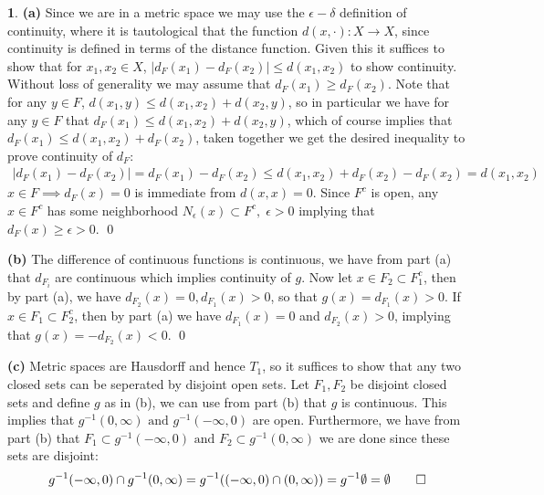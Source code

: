 \documentclass[10.5pt]{article}
\theoremstyle{definition}
\newtheorem{pb}{}
\newcommand{\abs}[1]{\left\vert#1\right\vert}
\newcommand{\tand}{\text{ and }}
\begin{document}
    \begin{pb}
        \textbf{(a)} Since we are in a metric space we may use the \(\epsilon-\delta\) definition of continuity, where it is tautological that the function \(d(x,\cdot):X \to X\), since continuity is defined in terms of the distance function. Given this it suffices to show that for \(x_1,x_2 \in X\), \(\abs{d_F(x_1) - d_F(x_2)} \leq d(x_1,x_2)\) to show continuity. Without loss of generality we may assume that \(d_F(x_1) \geq d_F(x_2)\). Note that for any \(y \in F\), \(d(x_1,y) \leq d(x_1,x_2) + d(x_2,y)\), so in particular we have for any \(y \in F\) that \(d_F(x_1) \leq d(x_1,x_2) + d(x_2,y)\), which of course implies that \(d_F(x_1) \leq d(x_1,x_2) + d_F(x_2)\), taken together we get the desired inequality to prove continuity of \(d_F\):
        \begin{align*}
            \abs{d_F(x_1) - d_F(x_2)} = d_F(x_1) - d_F(x_2) \leq d(x_1,x_2) + d_F(x_2) - d_F(x_2) = d(x_1,x_2)
        \end{align*}
        \(x \in F \implies d_F(x) = 0\) is immediate from \(d(x,x) = 0\). Since \(F^c\) is open, any \(x \in F^c\) has some neighborhood \(N_\epsilon(x) \subset F^c, \; \epsilon > 0\) implying that \(d_F(x) \geq \epsilon > 0\). \qed
        
        \textbf{(b)} The difference of continuous functions is continuous, we have from part (a) that \(d_{F_i}\) are continuous which implies continuity of \(g\). Now let \(x \in F_2 \subset F_1^c\), then by part (a), we have \(d_{F_2}(x) = 0, d_{F_1}(x) > 0\), so that \(g(x) = d_{F_1}(x) > 0\). If \(x \in F_1 \subset F_2^c\), then by part (a) we have \(d_{F_1}(x) = 0\) and \(d_{F_2}(x) > 0\), implying that \(g(x) = -d_{F_2}(x) < 0\). \qed

        \textbf{(c)} Metric spaces are Hausdorff and hence \(T_1\), so it suffices to show that any two closed sets can be seperated by disjoint open sets. Let \(F_1, F_2\) be disjoint closed sets and define \(g\) as in (b), we can use from part (b) that \(g\) is continuous. This implies that
        \(g^{-1}(0,\infty) \tand g^{-1}(-\infty,0)\) are open.  Furthermore, we have from part (b) that \(F_1 \subset g^{-1}(-\infty,0) \tand F_2 \subset g^{-1}(0,\infty)\) we are done since these sets are disjoint:
        \begin{align*}
            g^{-1}(-\infty,0)\cap g^{-1}(0,\infty) = g^{-1}((-\infty,0)\cap(0,\infty)) = g^{-1}\emptyset = \emptyset \qed
        \end{align*}
    \end{pb}
\end{document}
